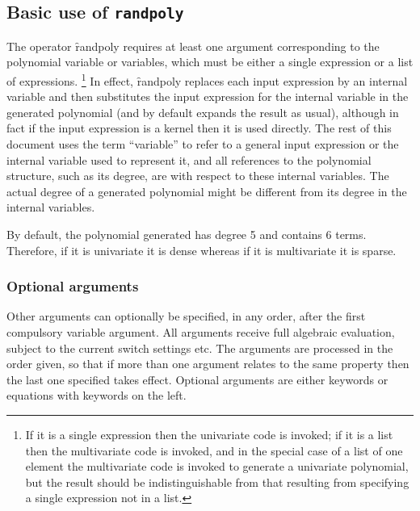 \subsection{Basic use of \texttt{randpoly}}
\label{randpolysec:Basic}

The operator \f{randpoly} requires at least one argument
corresponding to the polynomial variable or variables, which must be
either a single expression or a list of expressions.%
\footnote{If it is a single expression then the univariate code is
invoked; if it is a list then the multivariate code is invoked, and in
the special case of a list of one element the multivariate code is
invoked to generate a univariate polynomial, but the result should be
indistinguishable from that resulting from specifying a single
expression not in a list.} %
In effect, \f{randpoly} replaces each input expression by an
internal variable and then substitutes the input expression for the
internal variable in the generated polynomial (and by default expands
the result as usual), although in fact if the input expression is a
\REDUCE kernel then it is used directly.  The rest of this document
uses the term ``variable'' to refer to a general input expression or
the internal variable used to represent it, and all references to the
polynomial structure, such as its degree, are with respect to these
internal variables.  The actual degree of a generated polynomial might
be different from its degree in the internal variables.

By default, the polynomial generated has degree 5 and contains 6
terms.  Therefore, if it is univariate it is dense whereas if it is
multivariate it is sparse.


\subsubsection{Optional arguments}

Other arguments can optionally be specified, in any order, after the
first compulsory variable argument.  All arguments receive full
algebraic evaluation, subject to the current switch settings etc.  The
arguments are processed in the order given, so that if more than one
argument relates to the same property then the last one specified
takes effect.  Optional arguments are either keywords or equations
with keywords on the left.

